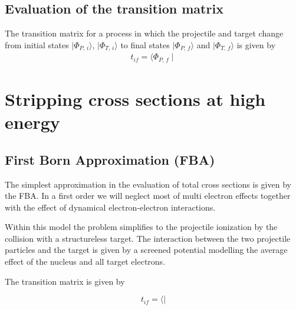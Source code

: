 \subsection{Evaluation of the transition matrix}

The transition matrix for a process in which the projectile and target
change from initial states $\mid \Phi_{P,\,i} \rangle $, $\mid
\Phi_{T,\,i} \rangle $ to final states $\mid \Phi_{P,\,f} \rangle$ and
$\mid \Phi_{T,\,f} \rangle$ is given by
\begin{eqnarray}\label{Q:Sim2}
t_{if} = \langle \Phi_{P,\,f} \mid
\end{eqnarray}



\section{Stripping cross sections at high energy}

\subsection{First Born Approximation (FBA)}

The simplest approximation in the evaluation of total cross sections is
given by the FBA. In a first order we will neglect most of multi
electron effects together with the effect of dynamical
electron-electron interactions.

Within this model the problem simplifies to the projectile ionization
by the collision with a structureless target. The interaction between
the two projectile particles and the target is given by a screened
potential modelling the average effect of the nucleus and all target
electrons.

The transition matrix is given by

\[
t_{if} = \langle \mid
\]



